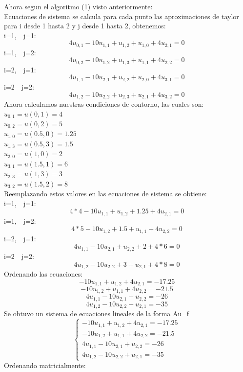 \documentclass[11pt,a4paper]{article}
\begin{document}
Ahora segun el algoritmo (1) visto anteriormente:\\
Ecuaciones de sistema
se calcula para cada punto las aproximaciones de taylor para i desde 1 hasta 2 y j desde 1 hasta 2, obtenemos:\\
i=1,~~j=1: $$4u_{0,1} - 10u_{1,1} + u_{1,2} + u_{1,0} + 4u_{2,1}=0$$ 
i=1,~~j=2: $$4u_{0,2} - 10u_{1,2} + u_{1,3} + u_{1,1} + 4u_{2,2}=0$$
i=2,~~j=1: $$4u_{1,1} - 10u_{2,1} + u_{2,2} + u_{2,0} + 4u_{3,1}=0$$
i=2~~j=2: $$4u_{1,2} - 10u_{2,2} + u_{2,3} + u_{2,1} + 4u_{3,2}=0$$
Ahora calculamos nuestras condiciones de contorno, las cuales son:\\
$u_{0,1}=u(0,1)=4$\\
$u_{0,2}=u(0,2)=5$\\
$u_{1,0}=u(0.5,0)=1.25$\\
$u_{1,3}=u(0.5,3)=1.5$\\
$u_{2,0}=u(1,0)=2$\\
$u_{3,1}=u(1.5,1)=6$\\
$u_{2,3}=u(1,3)=3$\\
$u_{3,2}=u(1.5,2)=8$\\
Reemplazando estos valores en las ecuaciones de sistema se obtiene:\\
i=1,~~j=1: $$4*4 - 10u_{1,1} + u_{1,2} + 1.25 + 4u_{2,1}=0$$ 
i=1,~~j=2: $$4*5 - 10u_{1,2} + 1.5 + u_{1,1} + 4u_{2,2}=0$$
i=2,~~j=1: $$4u_{1,1} - 10u_{2,1} + u_{2,2} + 2 + 4*6=0$$
i=2~~j=2: $$4u_{1,2} - 10u_{2,2} + 3 + u_{2,1} + 4*8=0$$
Ordenando las ecuaciones:\\
$$- 10u_{1,1} + u_{1,2} + 4u_{2,1} = -17.25$$ 
$$- 10u_{1,2} + u_{1,1} + 4u_{2,2} = -21.5$$
$$4u_{1,1} - 10u_{2,1} + u_{2,2} = -26$$
$$4u_{1,2} - 10u_{2,2} + u_{2,1} = -35$$
Se obtuvo un sistema de ecuaciones lineales de la forma Au=f\\
$$\left\{\begin{array}{crl}
\displaystyle- 10u_{1,1} + u_{1,2} + 4u_{2,1} = -17.25\\
- 10u_{1,2} + u_{1,1} + 4u_{2,2} = -21.5\\
4u_{1,1} - 10u_{2,1} + u_{2,2} = -26\\
4u_{1,2} - 10u_{2,2} + u_{2,1} = -35
\end{array}\right.
$$
Ordenando matricialmente:\\
\end{document}
